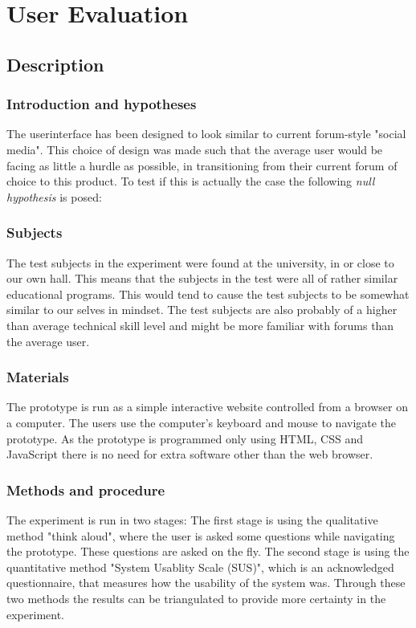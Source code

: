 \section{User Evaluation}
\subsection{Description}

\subsubsection{Introduction and hypotheses}
The userinterface has been designed to look similar to current forum-style "social media". This choice of design was made such that the average user would be facing as little a hurdle as possible, in transitioning from their current forum of choice to this product. To test if this is actually the case the following \textit{null hypothesis} is posed:\newline
\textit{}

\subsubsection{Subjects}
The test subjects in the experiment were found at the university, in or close to our own hall. This means that the subjects in the test were all of rather similar educational programs. This would tend to cause the test subjects to be somewhat similar to our selves in mindset. The test subjects are also probably of a higher than average technical skill level and might be more familiar with forums than the average user.

\subsubsection{Materials}
The prototype is run as a simple interactive website controlled from a browser on a computer. The users use the computer's keyboard and mouse to navigate the prototype. As the prototype is programmed only using HTML, CSS and JavaScript there is no need for extra software other than the web browser.

\subsubsection{Methods and procedure}
\label{procedure}
The experiment is run in two stages: The first stage is using the qualitative method "think aloud", where the user is asked some questions while navigating the prototype. These questions are asked on the fly. The second stage is using the quantitative method "System Usablity Scale (SUS)", which is an acknowledged questionnaire, that measures how the usability of the system was. Through these two methods the results can be triangulated to provide more certainty in the experiment.

